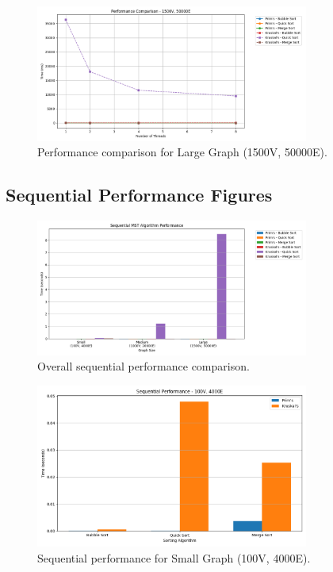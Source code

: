 \documentclass[11pt]{article}
\begin{document}
\begin{figure}[H]
    \centering
    \includegraphics[width=0.8\textwidth]{large_comparison.png}
    \caption{Performance comparison for Large Graph (1500V, 50000E).}
    \label{fig:large_comparison}
\end{figure}

\subsection{Sequential Performance Figures}
\begin{figure}[H]
    \centering
    \includegraphics[width=0.8\textwidth]{sequential_comparison.png}
    \caption{Overall sequential performance comparison.}
    \label{fig:sequential_comparison}
\end{figure}

\begin{figure}[H]
    \centering
    \includegraphics[width=0.8\textwidth]{sequential_small.png}
    \caption{Sequential performance for Small Graph (100V, 4000E).}
    \label{fig:sequential_small}
\end{figure}
\end{document}
